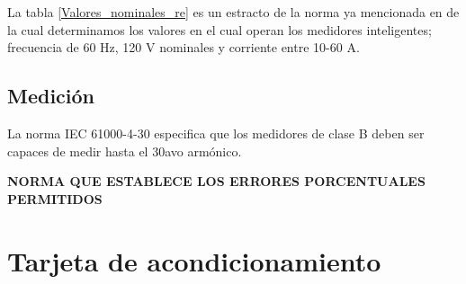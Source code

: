     \begin{table}[H]
    \centering
    \caption{\label{Valores_nominales_re}Valores nominales de operacion de la red eléctrica, extracto norma E-354-D-1608}
    \end{table}

    \par La tabla \ref{Valores_nominales_re} es un estracto de la norma ya mencionada en
     de la cual determinamos los valores en el cual operan los medidores inteligentes;
     frecuencia de 60 Hz, 120 V nominales y corriente entre 10-60 A.

  \subsection{Medición}

    La norma IEC 61000-4-30 especifica que los medidores de clase B deben ser capaces
     de medir hasta el 30avo armónico.

    \textbf{NORMA QUE ESTABLECE LOS ERRORES PORCENTUALES PERMITIDOS}

\section{Tarjeta de acondicionamiento}%


